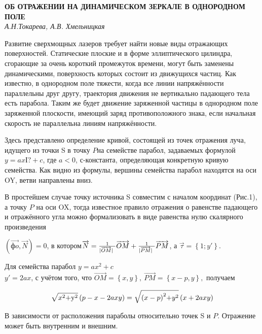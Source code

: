 \begin{center}{ \bf  ОБ ОТРАЖЕНИИ НА ДИНАМИЧЕСКОМ ЗЕРКАЛЕ В ОДНОРОДНОМ ПОЛЕ}\\
{\it А.Н.Токарева, А.В. Хмельницкая} \\
\end{center}

Развитие сверхмощных лазеров требует найти новые виды отражающих поверхностей. Статические плоские и в форме эллиптического цилиндра, сгорающие за очень короткий промежуток времени, могут быть заменены динамическими, поверхность которых состоит из движущихся частиц. Как известно, в однородном поле тяжести, когда все линии напряжённости параллельны друг другу, траектория движения не вертикально падающего тела есть парабола. Таким же будет движение заряженной частицы в однородном поле заряженной плоскости, имеющий заряд противоположного знака, если начальная скорость не параллельна линиям напряжённости.

Здесь представлено определение кривой, состоящей из точек отражения луча, идущего из точки S в точку $P$на семействе парабол, задаваемых формулой $y=axІ?+c$, где $a<0$, $с$-константа, определяющая конкретную кривую семейства. Как видно из формулы, вершины семейства парабол находятся на оси OY, ветви направлены вниз.

В простейшем случае точку источника S совместим с началом координат (Рис.1), а точку $P$ на оси OX, тогда известное правило отражения о равенстве падающего и отражённого угла можно формализовать в виде равенства нулю скалярного произведения

$(\overrightarrow{фo},\overrightarrow{N})=0$, в котором$\overrightarrow{N}=\frac{{\rm 1}}{|\overrightarrow{OM}|\ }\overrightarrow{OM}+\frac{{\rm 1}}{|\overrightarrow{PM}|\ }\overrightarrow{PM}$, а $\overrightarrow{\tau }=\left\{1;y'\right\}.$

Для семейства парабол $y=ax^2+c$\\
$y'=2ax$, с учётом того, что $\overrightarrow{OM}=\left\{x,y\right\},\ \overrightarrow{PM}=\left\{x-p,y\right\},$ получаем

\begin{equation} \label{GrindEQ__1_} \sqrt{x^{{\rm 2}}{\rm +}{{\rm y}}^{{\rm 2}}}\left(p-x-2axy\right)=\sqrt{(x-{p)}^{{\rm 2}}{\rm +}y^{{\rm 2}}}\left(x+2axy\right) \end{equation}

В зависимости от расположения параболы относительно точек S и $P$. Отражение может быть внутренним и внешним.

